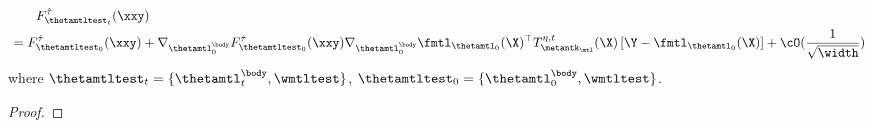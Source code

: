 \documentclass{article}
\begin{document}
\begin{lemma}
\begin{itemize}[leftmargin=*,align=left,noitemsep,nolistsep]
\begin{itemize}[leftmargin=*,align=left,noitemsep,nolistsep]
        \begin{align}\label{eq:F_t-test:mtl}
            &\qquad F^{\hat\tau}_{\thetamtltest_t}(\xxy) \nonumber\\
&= F^{\hat\tau}_{\thetamtltest_0}(\xxy) +\nabla_{\thetamtl_0^\body} F^{\hat \tau}_{\thetamtltest_0} (\xxy) \nabla_{\thetamtl_0^\body} \fmtl_{\thetamtl_0}(\X)^\top T^{\eta,t}_{\metantk_\mtl}(\X) \left[\Y - \fmtl_{\thetamtl_0}(\X)\right] + \cO(\frac{1}{\sqrt{\width}})
        \end{align}
        where $\thetamtltest_t = \{\thetamtl_t^\body, \wmtltest\}$, $\thetamtltest_0 = \{\thetamtl_0^\body, \wmtltest\}$.
    \end{itemize}
\end{itemize}
\end{lemma}
\begin{proof}


\end{proof}
\end{document}
